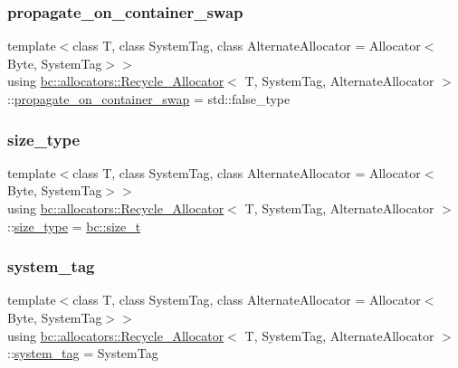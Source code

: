 \subsubsection{\texorpdfstring{propagate\+\_\+on\+\_\+container\+\_\+swap}{propagate\_on\_container\_swap}}
{\footnotesize\ttfamily template$<$class T, class System\+Tag, class Alternate\+Allocator = Allocator$<$\+Byte, System\+Tag$>$$>$ \\
using \hyperlink{structbc_1_1allocators_1_1Recycle__Allocator}{bc\+::allocators\+::\+Recycle\+\_\+\+Allocator}$<$ T, System\+Tag, Alternate\+Allocator $>$\+::\hyperlink{structbc_1_1allocators_1_1Recycle__Allocator_afda64ab9ab1d07149055d69505a3cbd0}{propagate\+\_\+on\+\_\+container\+\_\+swap} =  std\+::false\+\_\+type}

\mbox{\label{structbc_1_1allocators_1_1Recycle__Allocator_a1fcc90170edb7f8892ff5a248a7f3ec4}} 
\subsubsection{\texorpdfstring{size\+\_\+type}{size\_type}}
{\footnotesize\ttfamily template$<$class T, class System\+Tag, class Alternate\+Allocator = Allocator$<$\+Byte, System\+Tag$>$$>$ \\
using \hyperlink{structbc_1_1allocators_1_1Recycle__Allocator}{bc\+::allocators\+::\+Recycle\+\_\+\+Allocator}$<$ T, System\+Tag, Alternate\+Allocator $>$\+::\hyperlink{structbc_1_1allocators_1_1Recycle__Allocator_a1fcc90170edb7f8892ff5a248a7f3ec4}{size\+\_\+type} =  \hyperlink{namespacebc_aaf8e3fbf99b04b1b57c4f80c6f55d3c5}{bc\+::size\+\_\+t}}

\mbox{\label{structbc_1_1allocators_1_1Recycle__Allocator_a4a3cb90cf57efd82d70b09bbd020e1f4}} 
\subsubsection{\texorpdfstring{system\+\_\+tag}{system\_tag}}
{\footnotesize\ttfamily template$<$class T, class System\+Tag, class Alternate\+Allocator = Allocator$<$\+Byte, System\+Tag$>$$>$ \\
using \hyperlink{structbc_1_1allocators_1_1Recycle__Allocator}{bc\+::allocators\+::\+Recycle\+\_\+\+Allocator}$<$ T, System\+Tag, Alternate\+Allocator $>$\+::\hyperlink{structbc_1_1allocators_1_1Recycle__Allocator_a4a3cb90cf57efd82d70b09bbd020e1f4}{system\+\_\+tag} =  System\+Tag}

